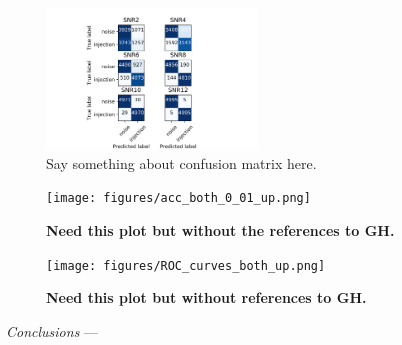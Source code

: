 \documentclass[%
 amsmath,amssymb,
 aps,
 twocolumn,
]{revtex4-1}
\begin{document}
\begin{figure}[]
 \centering
  \includegraphics[width=0.5\textwidth]
 {figures/confusion_matrix.png}
 \caption{\label{fig:confusion} Say something about confusion matrix here.}
\end{figure}

\begin{figure}[]
 \texttt{[image: figures/acc\_both\_0\_01\_up.png]}
 \caption{\label{fig:accuracy} \textbf{Need this plot but without the references to GH.}}
\end{figure}

\begin{figure}[]
 \texttt{[image: figures/ROC\_curves\_both\_up.png]}
 \caption{\label{fig: ROC curve} \textbf{Need this plot but without references to GH.}}
\end{figure}

\textit{Conclusions} --- 



\nocite{*}

\end{document}
